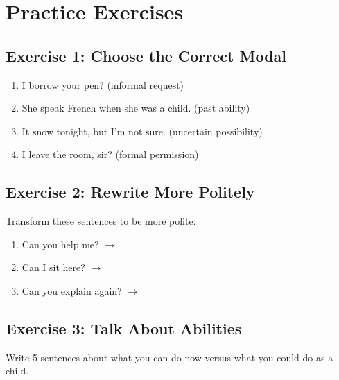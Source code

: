 \section{Practice Exercises}

\subsection{Exercise 1: Choose the Correct Modal}

\begin{enumerate}
    \item \underline{\hspace{2cm}} I borrow your pen? (informal request)
    \item She \underline{\hspace{2cm}} speak French when she was a child. (past ability)
    \item It \underline{\hspace{2cm}} snow tonight, but I'm not sure. (uncertain possibility)
    \item \underline{\hspace{2cm}} I leave the room, sir? (formal permission)
\end{enumerate}

\subsection{Exercise 2: Rewrite More Politely}
Transform these sentences to be more polite:

\begin{enumerate}
    \item Can you help me? $\rightarrow$ \underline{\hspace{5cm}}
    \item Can I sit here? $\rightarrow$ \underline{\hspace{5cm}}
    \item Can you explain again? $\rightarrow$ \underline{\hspace{5cm}}
\end{enumerate}

\subsection{Exercise 3: Talk About Abilities}
Write 5 sentences about what you can do now versus what you could do as a child.

\begin{tcolorbox}[colback=white,height=5cm]
\end{tcolorbox}

